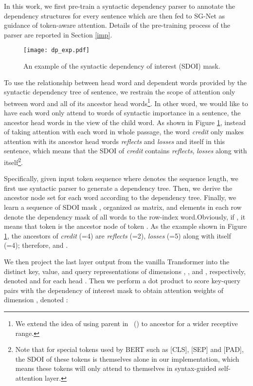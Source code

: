\documentclass[letterpaper]{article} \usepackage{color}
\begin{document}
In this work, we first pre-train a syntactic dependency parser to annotate the dependency structures for every sentence which are then fed to SG-Net as guidance of token-aware attention. Details of the pre-training process of the parser are reported in Section \ref{imp}. 



\begin{figure}
	\centering
	\texttt{[image: dp\_exp.pdf]}
	\caption{An example of the syntactic dependency of interest (SDOI) mask.}
	\label{dep}
\end{figure}

To use the relationship between head word and dependent words provided by the syntactic dependency tree of sentence, we restrain the scope of attention only between word and all of its ancestor head words\footnote{We extend the idea of using parent in \citeauthor{strubell2018linguistically}~(\citeyear{strubell2018linguistically}) to ancestor for a wider receptive range.}. In other word, we would like to have each word only attend to words of syntactic importance in a sentence, the ancestor head words in the view of the child word. As shown in Figure \ref{dep}, instead of taking attention with each word in whole passage, the word \textit{credit} only makes attention with its ancestor head words \textit{reflects} and \textit{losses} and itself in this sentence, which means that the SDOI of \textit{credit} contains \textit{reflects}, \textit{losses} along with itself\footnote{Note that for special tokens used by BERT such as [CLS], [SEP] and [PAD], the SDOI of these tokens is themselves alone in our implementation, which means these tokens will only attend to themselves in syntax-guided self-attention layer.}.

Specifically, given input token sequence  where  denotes the sequence length, we first use syntactic parser to generate a dependency tree. Then, we derive the ancestor node set  for each word  according to the dependency tree.  Finally, we learn a sequence of SDOI
mask , organized as  matrix, and elements in each row denote the dependency mask of all words to the row-index word.Obviously, if , it means that token  is the ancestor node of token . As the example shown in Figure \ref{dep}, the ancestors of \textit{credit} (=4) are \textit{reflects} (=2), \textit{losses} (=5) along with itself (=4); therefore,  and .

We then project the last layer output  from the vanilla Transformer into the distinct key, value, and query representations of dimensions , , and , respectively, denoted  and  for each head . Then we perform a dot product to score key-query pairs with the dependency of interest mask to obtain attention weights of dimension , denoted :
\end{document}
